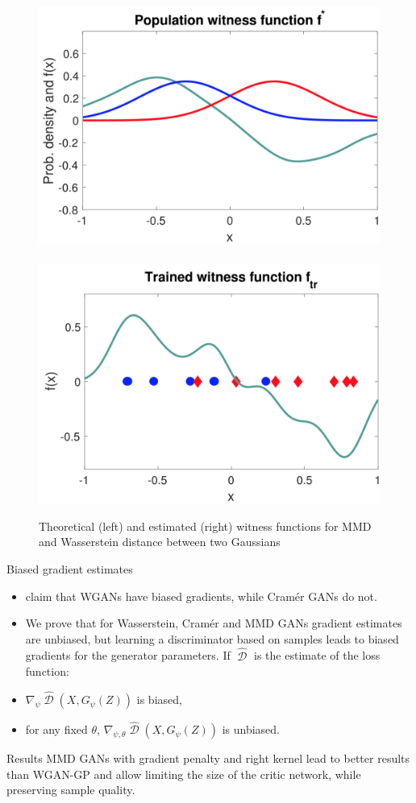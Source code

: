 \documentclass[xcolor={table}]{beamer}
\DeclareMathOperator{\D}{\mathcal{D}}
\begin{document}
\begin{frame}{}
\begin{columns}[T, totalwidth=\textwidth]
  \begin{column}{.32\textwidth}
    \begin{figure}
      \centering
      \includegraphics[width=.35\columnwidth]{figs/witness.png}
      ~
      \includegraphics[width=.35\columnwidth]{figs/trained_witness.png}
      \caption{Theoretical (left) and estimated (right) witness functions for MMD and Wasserstein distance between two Gaussians}
    \end{figure}
    \vspace*{-1.3cm}
    \begin{block}{Biased gradient estimates}
      \begin{itemize}
        \item \citet{cramer-gan} claim that WGANs have biased gradients, while Cram\'er GANs do not.
        \item We prove that for Wasserstein, Cram\'er and MMD GANs gradient estimates
              are unbiased, but learning a discriminator based on samples leads to biased gradients 
              for the generator parameters. If $\widehat{\D}$ is the estimate of the loss function: 
        \item $\nabla_{\psi}\widehat{\D}(X, G_{\psi}(Z))$ is biased,
        \item for any fixed $\theta$, $\nabla_{\psi, \theta} \widehat{\D}(X, G_{\psi}(Z))$ is unbiased.
      \end{itemize}
    \end{block}
    \vspace*{-1.3cm}
    \begin{block}{Results}
      MMD GANs with gradient penalty and right kernel lead to better results 
      than WGAN-GP and allow limiting the size of the critic
      network, while preserving sample quality. %

\end{block}
\end{column}
\end{columns}
\end{frame}
\end{document}
